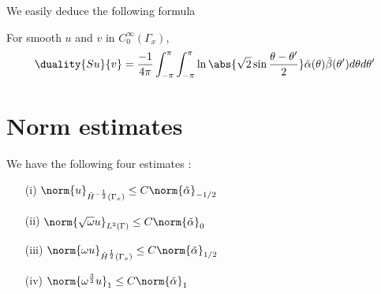 \documentclass[11pt,a4paper]{article}
\begin{document}
	We easily deduce the following formula	
	\begin{Lem} For smooth $u$ and $v$ in $C^{\infty}_0(\Gamma_x)$, 
		\begin{equation}
			\duality{Su}{v} = \frac{-1}{4\pi} \int_{-\pi}^{\pi}\int_{-\pi}^{\pi} \ln\abs{\sqrt{2}\sin\frac{\theta - \theta'}{2}}\tilde{\alpha}(\theta)\tilde{\beta}(\theta')d\theta d\theta'
		\end{equation}
		
	\end{Lem}
	
	\section{Norm estimates}
	
	\begin{The}
		We have the following four estimates : 
		\begin{enumerate}
			\item[(i)] $\norm{u}_{\tilde{H}^{-\frac{1}{2}}(\Gamma_x)}  \leq C \norm{\tilde{\alpha}}_{-1/2}$ 
			\item[(ii)] $\norm{\sqrt{\omega}u}_{L^2(\Gamma)} \leq C \norm{\tilde{\alpha}}_{0}$
			\item[(iii)] $\norm{\omega u}_{\tilde{H}^{\frac{1}{2}}(\Gamma_x)} \leq C \norm{\tilde{\alpha}}_{1/2}$
			\item[(iv)] $\norm{\omega^{\frac{3}{2}} u}_{1} \leq C \norm{\tilde{\alpha}}_{1}$
		\end{enumerate}
	\end{The}
\end{document}
